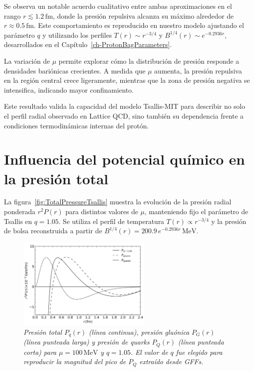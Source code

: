 Se observa un notable acuerdo cualitativo entre ambas aproximaciones en el rango \( r \lesssim 1.2\,\mathrm{fm} \), donde la presión repulsiva alcanza su máximo alrededor de \( r \approx 0.5\,\mathrm{fm} \). Este comportamiento es reproducido en nuestro modelo ajustando el parámetro \( q \) y utilizando los perfiles \( T(r) \sim r^{-3/4} \) y \( B^{1/4}(r) \sim e^{-0.2936r} \), desarrollados en el Capítulo~\ref{ch-ProtonBagParameters}.

\begin{remark}
    La variación de \( \mu \) permite explorar cómo la distribución de presión responde a densidades bariónicas crecientes. A medida que \( \mu \) aumenta, la presión repulsiva en la región central crece ligeramente, mientras que la zona de presión negativa se intensifica, indicando mayor confinamiento.
\end{remark}

Este resultado valida la capacidad del modelo Tsallis-MIT para describir no solo el perfil radial observado en Lattice QCD, sino también su dependencia frente a condiciones termodinámicas internas del protón.

\section{Influencia del potencial químico en la presión total}

La figura~\ref{fig:TotalPressureTsallis} muestra la evolución de la presión radial ponderada \( r^2 P(r) \) para distintos valores de \( \mu \), manteniendo fijo el parámetro de Tsallis en \( q = 1.05 \). Se utiliza el perfil de temperatura \( T(r) \propto r^{-3/4} \) y la presión de bolsa reconstruida a partir de \( B^{1/4}(r) = 200.9\,e^{-0.2936r}\,\mathrm{MeV} \).

\begin{figure}
    \centering
    \includegraphics[width=0.58\textwidth]{./Images/PressureDistributionsTot-Q-G.png}
    \caption[Descomposición de presión radial]{\emph{Presión total \( P_q(r) \) (línea continua), presión gluónica \( P_G(r) \) (línea punteada larga) y presión de quarks \( P_Q(r) \) (línea punteada corta) para \( \mu = 100\,\mathrm{MeV} \) y \( q = 1.05 \). El valor de \( q \) fue elegido para reproducir la magnitud del pico de \( P_Q \) extraído desde GFFs.}}
    \label{fig:PressureDecompResult}
\end{figure}

